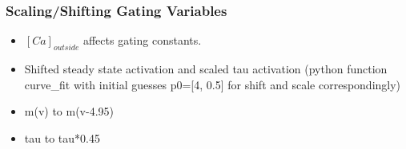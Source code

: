 \documentclass[../../workflow.tex]{subfiles}
\begin{document}
\subsubsection{Scaling/Shifting Gating Variables}

\color{red}

\begin{itemize}
    \item $[Ca]_{outside}$ affects gating constants.
    \item Shifted steady state activation and scaled tau activation (python function curve\_fit
    with initial guesses p0=[4, 0.5] for shift and scale correspondingly)
    \item m(v) to m(v-4.95)
    \item tau to tau*0.45
\end{itemize}

\color{black}
\end{document}
